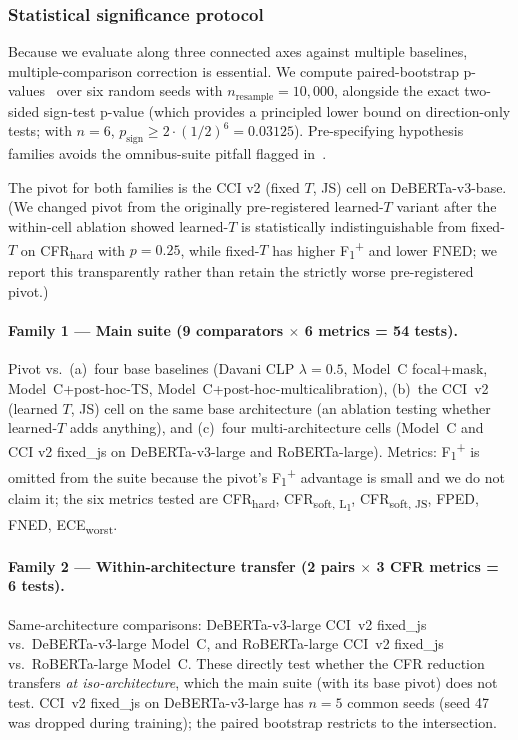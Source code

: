 \documentclass[10pt,a4paper]{article}
\begin{document}
\subsubsection{Statistical significance protocol}
\label{sec:sig_protocol}

Because we evaluate along three connected axes against multiple baselines, multiple-comparison correction is essential. We compute paired-bootstrap p-values~\citep{dror2018hitchhikers} over six random seeds with $n_{\text{resample}} = 10{,}000$, alongside the exact two-sided sign-test p-value (which provides a principled lower bound on direction-only tests; with $n=6$, $p_{\text{sign}} \ge 2 \cdot (1/2)^6 = 0.03125$). Pre-specifying hypothesis families avoids the omnibus-suite pitfall flagged in~\citet{dror2018hitchhikers}.

The pivot for both families is the CCI v2 (fixed $T$, JS) cell on DeBERTa-v3-base. (We changed pivot from the originally pre-registered learned-$T$ variant after the within-cell ablation showed learned-$T$ is statistically indistinguishable from fixed-$T$ on CFR\textsubscript{hard} with $p = 0.25$, while fixed-$T$ has higher F\textsubscript{1}\textsuperscript{+} and lower FNED; we report this transparently rather than retain the strictly worse pre-registered pivot.)

\paragraph{Family 1 — Main suite (9 comparators $\times$ 6 metrics = 54 tests).}
Pivot vs.\ (a)~four base baselines (Davani CLP $\lambda{=}0.5$, Model~C focal+mask, Model~C+post-hoc-TS, Model~C+post-hoc-multicalibration), (b)~the CCI~v2 (learned $T$, JS) cell on the same base architecture (an ablation testing whether learned-$T$ adds anything), and (c)~four multi-architecture cells (Model~C and CCI v2 fixed\_js on DeBERTa-v3-large and RoBERTa-large). Metrics: F\textsubscript{1}\textsuperscript{+} is omitted from the suite because the pivot's F\textsubscript{1}\textsuperscript{+} advantage is small and we do not claim it; the six metrics tested are CFR\textsubscript{hard}, CFR\textsubscript{soft, L\textsubscript{1}}, CFR\textsubscript{soft, JS}, FPED, FNED, ECE\textsubscript{worst}.

\paragraph{Family 2 — Within-architecture transfer (2 pairs $\times$ 3 CFR metrics = 6 tests).}
Same-architecture comparisons: DeBERTa-v3-large CCI~v2 fixed\_js vs.\ DeBERTa-v3-large Model~C, and RoBERTa-large CCI~v2 fixed\_js vs.\ RoBERTa-large Model~C. These directly test whether the CFR reduction transfers \emph{at iso-architecture}, which the main suite (with its base pivot) does not test. CCI~v2 fixed\_js on DeBERTa-v3-large has $n=5$ common seeds (seed 47 was dropped during training); the paired bootstrap restricts to the intersection.
\end{document}
